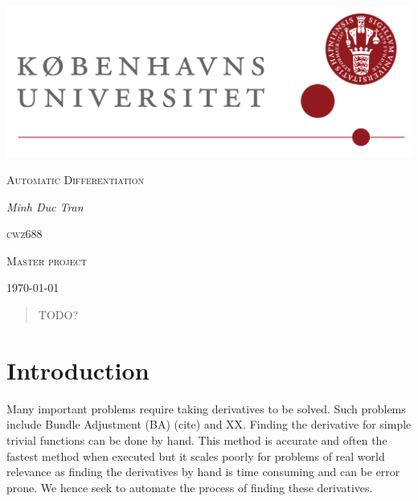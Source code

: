 
\usepackage{amsthm}
\usepackage{xcolor}


\theoremstyle{definition}
\newtheorem{definition}{Definition}[section]
\newtheorem{problem}{Problem}[section]
\newtheorem{theorem}{Theorem}[section]
\newtheorem{corollary}{Corollary}[theorem]
\newtheorem{lemma}[theorem]{Lemma}
\usepackage{hyperref}

\author{Minh}

	\begin{titlepage}
		\centering
		\includegraphics[width=\textwidth]{KuLogo.png}
		\par\vspace{1cm}
		\vspace{1cm}
		
		{\scshape\Large Automatic Differentiation \\
			\par}
		
		\vspace{1.5cm}
		{\Large\itshape  Minh Duc Tran }\\
		\vspace{0.5cm}
		{\scshape\large cwz688 \\ \par}
		\vfill
		
		{\Large\scshape Master project \par}
		
		\vfill
		\par
		\vfill
		{\large \today\par}
	\end{titlepage}
	\newpage
	\tableofcontents
	\newpage 
	\begin{abstract}
		TODO?
	\end{abstract}
	\section{Introduction}
	Many important problems require taking derivatives to be solved. Such problems
	include Bundle Adjustment (BA) (cite) and XX. Finding the derivative for simple
	trivial functions can be done by hand. This method is accurate and often the 
	fastest method when executed but it scales poorly for problems of real world
	relevance as finding the derivatives by hand is time consuming and can be error prone.  We
	hence seek to automate the process of finding these derivatives. \newline 
	
